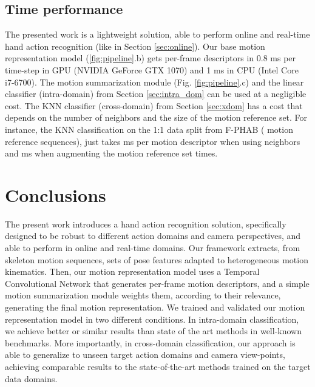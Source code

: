 \documentclass[letterpaper, 10 pt, conference]{ieeeconf}
\begin{document}
\subsection{Time performance}\label{sec:time}
The presented work is a lightweight solution, able to perform online and real-time hand action recognition (like in Section \ref{sec:online}).
Our base motion representation model (\ref{fig:pipeline}.b) gets per-frame descriptors in 0.8 ms per time-step in GPU (NVIDIA GeForce GTX 1070) 
and 1 ms in CPU (Intel Core  i7-6700).
The motion summarization module (Fig. \ref{fig:pipeline}.c) and the linear classifier (intra-domain) from Section \ref{sec:intra_dom} can be used at a negligible cost.
The KNN classifier (cross-domain) from Section \ref{sec:xdom} has a cost  that depends on the number of neighbors  and the size  of the motion reference set. 
For instance, the KNN classification on the 1:1 data split from F-PHAB ( motion reference sequences), just takes  ms per motion descriptor when using  neighbors and  ms when augmenting the motion reference set  times.



\section{Conclusions}

The present work introduces a hand action recognition solution, specifically designed to be robust to different action domains and camera perspectives, and able to perform in online and real-time domains.
Our framework extracts, from skeleton motion sequences, sets of pose features adapted to heterogeneous motion kinematics.
Then, our motion representation model uses a Temporal Convolutional Network that generates per-frame motion descriptors, and a simple motion summarization module weights them, according to their relevance, generating the final motion representation.
We trained and validated our motion representation model in two different conditions. In intra-domain classification, we achieve better or similar results than state of the art methods 
in well-known benchmarks.
More importantly, in cross-domain classification, our approach is able to generalize to unseen target action domains and camera view-points, achieving comparable results to the state-of-the-art methods trained on the target data domains.

{


}
\end{document}
